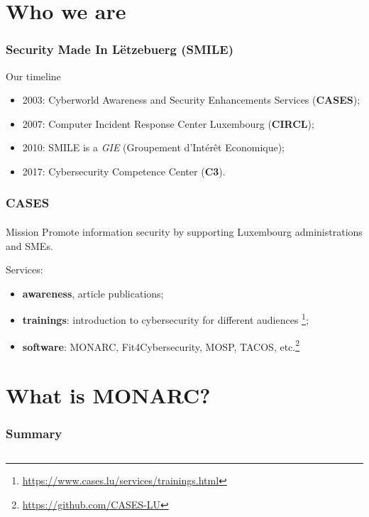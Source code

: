%
%
\section{Who we are}
\begin{frame}
    \frametitle{Security Made In Lëtzebuerg (SMILE)}
    Our timeline
    \begin{center}
        \begin{itemize}
            \item 2003: Cyberworld Awareness and Security Enhancements Services (\textbf{CASES});
            \item 2007: Computer Incident Response Center Luxembourg (\textbf{CIRCL});
            \item 2010: SMILE is a \textit{GIE} (Groupement d’Intérêt Economique);
            \item 2017: Cybersecurity Competence Center (\textbf{C3}).
        \end{itemize}
    \end{center}
\end{frame}

\begin{frame}
    \frametitle{CASES}
    \framesubtitle{}
    \begin{block}{Mission}
        Promote information security by supporting Luxembourg administrations and SMEs.
    \end{block}
    \bigskip
    Services:
    \begin{center}
        \begin{itemize}
            \item \textbf{awareness}, article publications;
            \item \textbf{trainings}:
                introduction to cybersecurity for different audiences \footnote{\url{https://www.cases.lu/services/trainings.html}};
            \item \textbf{software}:
                MONARC, Fit4Cybersecurity, MOSP, TACOS, etc.\footnote{\url{https://github.com/CASES-LU}}
        \end{itemize}
    \end{center}
\end{frame} 




% 
%
\section{What is MONARC?}
\begin{frame}
    \frametitle{Summary}
    \begin{columns}[t]
        \begin{column}{5cm}
            \tableofcontents[sections={1-3}, currentsection, hideothersubsections]
        \end{column}
        \begin{column}{5cm}
            \tableofcontents[sections={4-5}, currentsection, hideothersubsections]
        \end{column}
    \end{columns}
\end{frame}
